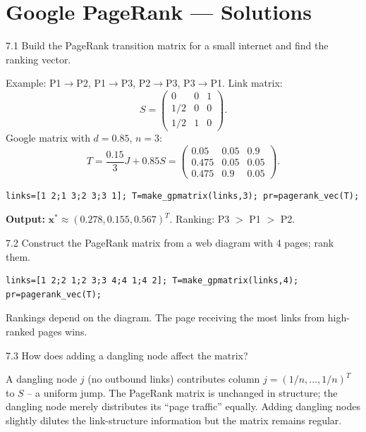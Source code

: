 \chapter{Google PageRank --- Solutions}

\begin{exercise}{7.1}
Build the PageRank transition matrix for a small internet and find the ranking vector.
\end{exercise}
\begin{solution}
Example: P1$\to$P2, P1$\to$P3, P2$\to$P3, P3$\to$P1. Link matrix:
\[S=\begin{pmatrix}0&0&1\\1/2&0&0\\1/2&1&0\end{pmatrix}.\]
Google matrix with $d=0.85$, $n=3$:
\[T=\frac{0.15}{3}J+0.85S=\begin{pmatrix}0.05&0.05&0.9\\0.475&0.05&0.05\\0.475&0.9&0.05\end{pmatrix}.\]
\begin{lstlisting}
links=[1 2;1 3;2 3;3 1]; T=make_gpmatrix(links,3); pr=pagerank_vec(T);
\end{lstlisting}
\textbf{Output:} $\mathbf{x}^*\approx(0.278,0.155,0.567)^T$. Ranking: P3 $>$ P1 $>$ P2.
\end{solution}

\begin{exercise}{7.2}
Construct the PageRank matrix from a web diagram with 4 pages; rank them.
\end{exercise}
\begin{solution}
\begin{lstlisting}
links=[1 2;2 1;2 3;3 4;4 1;4 2]; T=make_gpmatrix(links,4); pr=pagerank_vec(T);
\end{lstlisting}
Rankings depend on the diagram. The page receiving the most links from high-ranked pages wins.
\end{solution}

\begin{exercise}{7.3}
How does adding a dangling node affect the matrix?
\end{exercise}
\begin{solution}
A dangling node $j$ (no outbound links) contributes column $j=(1/n,\ldots,1/n)^T$ to $S$ -- a uniform jump. The PageRank matrix is unchanged in structure; the dangling node merely distributes its ``page traffic'' equally. Adding dangling nodes slightly dilutes the link-structure information but the matrix remains regular.
\end{solution}

